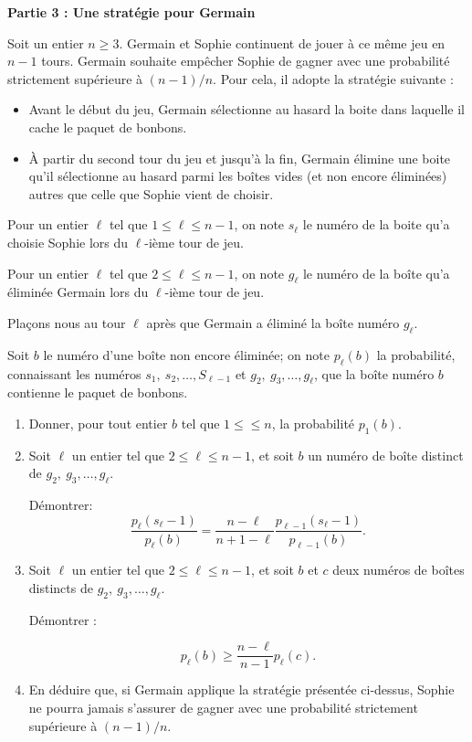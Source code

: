 \documentclass[landscape,twocolumn,leqno,a4paper,10pt]{report} %
\renewcommand{\textbf}[1]{\begingroup\bfseries\mathversion{bold}#1\endgroup}		%
\begin{document}
\bigskip
\begin{center}
\textbf{Partie 3 : Une stratégie pour Germain}\end{center}

Soit un entier $n \geqslant 3$. Germain et Sophie continuent de jouer à ce même jeu en  $n - 1$ tours. Germain souhaite empêcher Sophie de gagner avec une probabilité strictement supérieure à $(n - 1)/ n$. Pour cela, il adopte la stratégie suivante :

\begin{itemize}
\item Avant le début du jeu, Germain sélectionne au hasard la boite dans laquelle il cache le paquet de bonbons.
\item À partir du second tour du jeu et jusqu'à la fin, Germain élimine une boite qu'il sélectionne au hasard parmi les boîtes vides (et non encore éliminées) autres que celle que Sophie vient de choisir.
\end{itemize}

Pour un entier $\ell$ tel que $1 \leqslant \ell \leqslant n - 1$, on note $s_{\ell}$ le numéro de la boite qu'a choisie Sophie lors du $\ell$-ième tour de jeu.

Pour un entier $\ell$ tel que $2 \leqslant \ell \leqslant n - 1$, on note $g_{\ell}$ le numéro de la boîte qu'a éliminée Germain lors du $\ell$-ième tour de jeu.

Plaçons nous au tour $\ell$ après que Germain a éliminé la boîte numéro $g_{\ell}$.

Soit $b$ le numéro d'une boîte non encore éliminée; on note $p_{\ell}(b)$ la probabilité, connaissant les numéros $s_1,\:s_2, \ldots, S_{\ell - 1}$ et $g_2,\:g_3, \ldots, g_{\ell}$, que la boîte numéro $b$ contienne le paquet de bonbons.

\begin{enumerate}[resume]
\item Donner, pour tout entier $b$ tel que $1 \leqslant \leqslant  n$, la probabilité $p_1(b)$. 
\item Soit $\ell$ un entier tel que $2 \leqslant \ell \leqslant n-1$, et soit $b$ un numéro de boîte distinct de $g_2,\:g_3, \ldots, g_{\ell}$.

Démontrer:
\[\dfrac{p_{\ell}\left(s_{\ell}- 1\right)}{p_{\ell}(b)} = \dfrac{n - \ell}{n + 1 - \ell} \dfrac{p_{\ell - 1}\left(s_{\ell} - 1\right)}{p_{\ell -1}(b)}.\]

\item Soit $\ell$ un entier tel que $2 \leqslant \ell \leqslant n - 1$, et soit $b$ et $c$ deux numéros de boîtes distincts de $g_2,\:g_3, \ldots, g_{\ell}$.

Démontrer :

\[p_{\ell}(b) \geqslant \dfrac{n - \ell}{n - 1}p_{ \ell}(c).\]

\item En déduire que, si Germain applique la stratégie présentée ci-dessus, Sophie ne pourra jamais s'assurer de gagner avec une probabilité strictement supérieure à $(n - 1)/ n$.
\end{enumerate}
\end{document}
